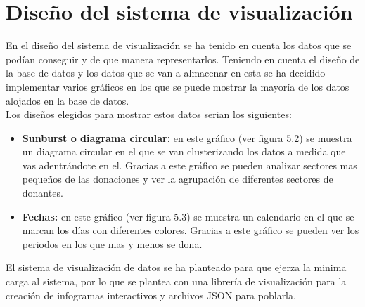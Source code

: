 \section{Diseño del sistema de visualización}
En el diseño del sistema de visualización se ha tenido en cuenta los datos que se podían conseguir y de que manera representarlos. Teniendo en cuenta el diseño de la base de datos y los datos que se van a almacenar en esta se ha decidido implementar varios gráficos en los que se puede mostrar la mayoría de los datos alojados en la base de datos.\\

Los diseños elegidos para mostrar estos datos serian los siguientes:

\begin{itemize}
	\item \textbf{Sunburst o diagrama circular:} en este gráfico (ver figura 5.2) se muestra un diagrama circular en el que se van clusterizando los datos a medida que vas adentrándote en el. Gracias a este gráfico se pueden analizar sectores mas pequeños de las donaciones y ver la agrupación de diferentes sectores de donantes.
	\item \textbf{Fechas:} en este gráfico (ver figura 5.3) se muestra un calendario en el que se marcan los días con diferentes colores. Gracias a este gráfico se pueden ver los periodos en los que mas y menos se dona.
\end{itemize} 

El sistema de visualización de datos se ha planteado para que ejerza la minima carga al sistema, por lo que se plantea con una librería de visualización para la creación de infogramas interactivos y archivos JSON para poblarla.

